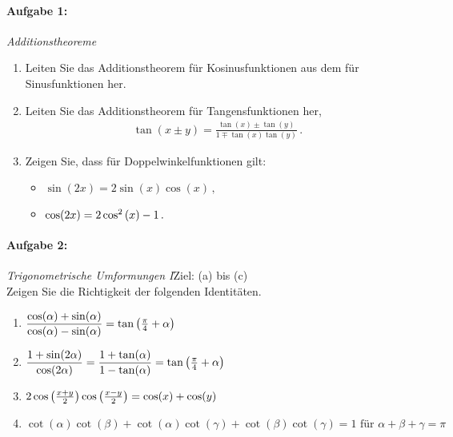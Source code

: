 
\paragraph{Aufgabe 1: } \emph{Additionstheoreme}\\[-1em]
\begin{enumerate}[label=(\alph*)]
\item Leiten Sie das Additionstheorem für Kosinusfunktionen aus dem für Sinusfunktionen her.
\item Leiten Sie das Additionstheorem für Tangensfunktionen her,
\begin{align*}
    \tan(x\pm y)=\frac{\tan(x)\pm \tan(y)}{1\mp \tan(x)\tan(y)}\,.
\end{align*}
\item Zeigen Sie, dass für Doppelwinkelfunktionen gilt:
\begin{itemize}
    \item $\sin(2x)=2\sin(x)\cos(x)\,,$
    \item $\cos(2x)=2\cos^2\qty(x)-1\,.$
\end{itemize}
\end{enumerate}

\paragraph{Aufgabe 2: } \emph{Trigonometrische Umformungen I}\hfill Ziel: (a) bis (c)\\[0.2cm]
Zeigen Sie die Richtigkeit der folgenden Identitäten.
\begin{enumerate}[label=(\alph*)]
    \item $\dfrac{\cos(\alpha)+\sin(\alpha)}{\cos(\alpha)-\sin(\alpha)}=\tan\qty(\frac{\pi}{4}+\alpha)$
    \item $\dfrac{1+\sin (2\alpha)}{\cos (2\alpha)}=\dfrac{1+\tan(\alpha)}{1-\tan(\alpha)}=\tan\qty(\frac{\pi}{4}+\alpha)$
    \item $2\cos\qty(\frac{x+y}{2})\cos\qty(\frac{x-y}{2})=\cos(x)+\cos(y)$
    \item $\cot(\alpha)\cot(\beta)+\cot(\alpha)\cot(\gamma)+\cot(\beta)\cot(\gamma)=1 \text{ für } \alpha+\beta+\gamma=\pi$
\end{enumerate}

